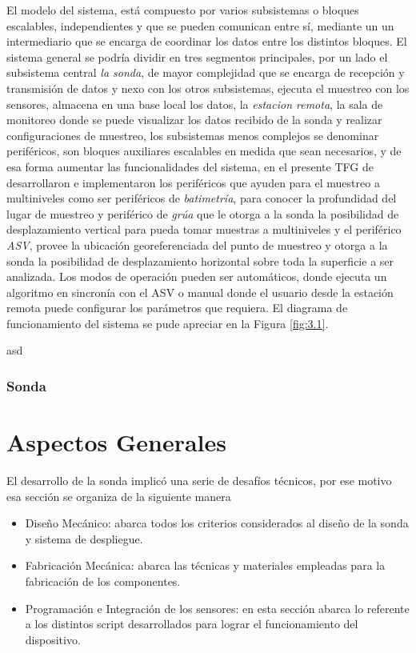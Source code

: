 El modelo del sistema, está compuesto por varios subsistemas o bloques escalables, independientes y que se pueden comunican entre s\'i, mediante un un intermediario que se encarga de coordinar los datos entre los distintos bloques. El sistema general se podr\'ia dividir en tres segmentos principales, por un lado el subsistema central \textit{la sonda}, de mayor complejidad que se encarga de recepci\'on y transmisi\'on de datos y nexo con los otros subsistemas, ejecuta el muestreo con los sensores, almacena en una base local los datos, la \textit{estacion remota}, la sala de monitoreo donde se puede visualizar los datos recibido de la sonda y realizar configuraciones de muestreo, los subsistemas menos complejos se denominar perif\'ericos, son bloques auxiliares escalables en medida que sean necesarios, y de esa forma aumentar las funcionalidades del sistema, en el presente TFG de desarrollaron e implementaron los perif\'ericos que ayuden para el muestreo a multiniveles como ser perif\'ericos de \textit{batimetr\'ia}, para conocer la profundidad del lugar de muestreo y perif\'erico de \textit{gr\'ua} que le otorga a la sonda la posibilidad de desplazamiento vertical para pueda tomar muestras a multiniveles y el perif\'erico \textit{ASV}, provee la ubicaci\'on georeferenciada del punto de muestreo y otorga a la sonda la posibilidad de desplazamiento horizontal sobre toda la superficie a ser analizada. Los modos de operaci\'on pueden ser autom\'aticos, donde ejecuta un algoritmo en sincron\'ia con el ASV o manual donde el usuario desde la estaci\'on remota puede configurar los par\'ametros que requiera.  
El diagrama de funcionamiento del sistema se pude apreciar en la Figura \ref{fig:3.1}.

asd 


\subsubsection{Sonda}








\section{Aspectos Generales}
El desarrollo de la sonda implic\'o una serie de desaf\'ios t\'ecnicos, por ese motivo esa secci\'on se organiza de la siguiente manera

\begin{itemize}
    \item Dise\~no Mec\'anico: abarca todos los criterios considerados al dise\~no de la sonda y sistema de despliegue. 
    \item Fabricaci\'on Mec\'anica: abarca las t\'ecnicas y materiales empleadas para la fabricaci\'on de los componentes.
    \item Programaci\'on e Integraci\'on de los sensores: en esta secci\'on abarca lo referente a los distintos script desarrollados para lograr el funcionamiento del dispositivo.
\end{itemize}
